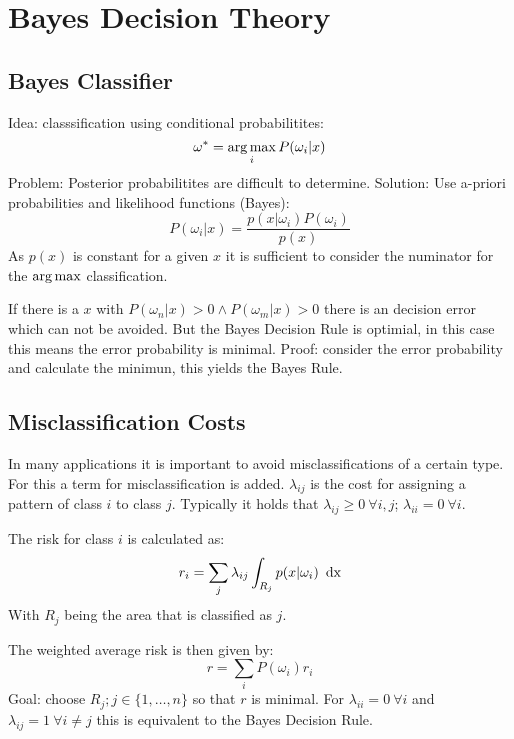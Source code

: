 \chapter{Bayes Decision Theory}
\section{Bayes Classifier}
Idea: classsification using conditional probabilitites:
\begin{equation*}
    \omega^* = \operatorname*{arg\,max}_i P(\omega_i | x)
\end{equation*}
Problem: Posterior probabilitites are difficult to determine. Solution: Use a-priori probabilities and likelihood functions (Bayes):
\begin{equation*}
    P(\omega_i | x) = \frac{p(x | \omega_i) P(\omega_i)}{p(x)}
\end{equation*}
As $p(x)$ is constant for a given $x$ it is sufficient to consider the numinator for the $\operatorname*{arg\,max}$ classification. 

If there is a $x$ with $P(\omega_n | x) > 0 \land P(\omega_m | x) > 0$ there is an decision error which can not be avoided. But the Bayes Decision Rule is optimial, in this case this means the error probability is minimal. Proof: consider the error probability and calculate the minimun, this yields the Bayes Rule.

\section{Misclassification Costs}
In many applications it is important to avoid misclassifications of a certain type. 
For this a term for misclassification is added. $\lambda_{ij}$ is the cost for assigning a pattern of class $i$ to class $j$. 
Typically it holds that $\lambda_{ij} \geq 0\ \forall i,j$; $\lambda_{ii} = 0\ \forall i$.

The risk for class $i$ is calculated as:
\begin{equation*}
    r_i = \sum_j \lambda_{ij} \int_{R_j} p(x | \omega_i) \operatorname*{\text{ d}x}
\end{equation*}
With $R_j$ being the area that is classified as $j$.

The weighted average risk is then given by:
\begin{equation*}
    r = \sum_i P(\omega_i) r_i
\end{equation*}
Goal: choose $R_j; j \in \{1, \ldots, n\}$ so that $r$ is minimal. For $\lambda_{ii} = 0\ \forall i$ and $\lambda_{ij} = 1\ \forall i \neq j$ this is equivalent to the Bayes Decision Rule.

